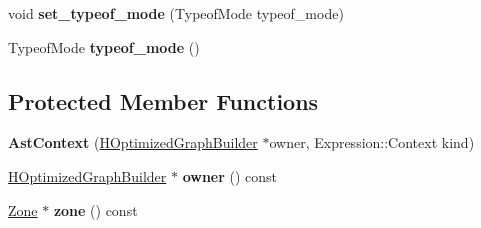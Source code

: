 \begin{DoxyCompactItemize}
\item 
void {\bfseries set\+\_\+typeof\+\_\+mode} (Typeof\+Mode typeof\+\_\+mode)\hypertarget{classv8_1_1internal_1_1_ast_context_ae393c0ac0aa2c0012be4659c17e3c9f2}{}\label{classv8_1_1internal_1_1_ast_context_ae393c0ac0aa2c0012be4659c17e3c9f2}

\item 
Typeof\+Mode {\bfseries typeof\+\_\+mode} ()\hypertarget{classv8_1_1internal_1_1_ast_context_aeb2fa99ba3732dfd745ef2c1ff059afb}{}\label{classv8_1_1internal_1_1_ast_context_aeb2fa99ba3732dfd745ef2c1ff059afb}

\end{DoxyCompactItemize}
\subsection*{Protected Member Functions}
\begin{DoxyCompactItemize}
\item 
{\bfseries Ast\+Context} (\hyperlink{classv8_1_1internal_1_1_h_optimized_graph_builder}{H\+Optimized\+Graph\+Builder} $\ast$owner, Expression\+::\+Context kind)\hypertarget{classv8_1_1internal_1_1_ast_context_a2f95ba98943cf65575eb4fde31afe7fb}{}\label{classv8_1_1internal_1_1_ast_context_a2f95ba98943cf65575eb4fde31afe7fb}

\item 
\hyperlink{classv8_1_1internal_1_1_h_optimized_graph_builder}{H\+Optimized\+Graph\+Builder} $\ast$ {\bfseries owner} () const \hypertarget{classv8_1_1internal_1_1_ast_context_a0faad2f9a48cd43801a1d84e9a0b0988}{}\label{classv8_1_1internal_1_1_ast_context_a0faad2f9a48cd43801a1d84e9a0b0988}

\item 
\hyperlink{classv8_1_1internal_1_1_zone}{Zone} $\ast$ {\bfseries zone} () const \hypertarget{classv8_1_1internal_1_1_ast_context_abea1ff333fcef5a2057297c917f1fe9b}{}\label{classv8_1_1internal_1_1_ast_context_abea1ff333fcef5a2057297c917f1fe9b}

\end{DoxyCompactItemize}

